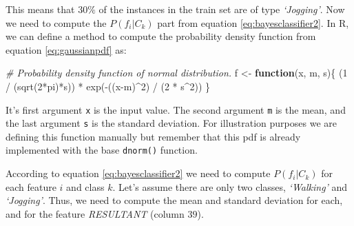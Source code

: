\documentclass[
  11pt,
]{krantz}
\newenvironment{Shaded}{\begin{snugshade}}{\end{snugshade}}
\newcommand{\CommentTok}[1]{\textcolor[rgb]{0.37,0.37,0.37}{\textit{#1}}}
\newcommand{\ControlFlowTok}[1]{\textcolor[rgb]{0.27,0.27,0.27}{\textbf{#1}}}
\newcommand{\DecValTok}[1]{\textcolor[rgb]{0.06,0.06,0.06}{#1}}
\newcommand{\FunctionTok}[1]{\textcolor[rgb]{0,0,0}{#1}}
\newcommand{\NormalTok}[1]{#1}
\newcommand{\OtherTok}[1]{\textcolor[rgb]{0.37,0.37,0.37}{#1}}
\newcommand{\SpecialCharTok}[1]{\textcolor[rgb]{0,0,0}{#1}}
\begin{document}
This means that \(30\%\) of the instances in the train set are of type \emph{`Jogging'}. Now we need to compute the \(P(f_i|C_k)\) part from equation \eqref{eq:bayesclassifier2}. In R, we can define a method to compute the probability density function from equation \eqref{eq:gaussianpdf} as:

\begin{Shaded}
\begin{Highlighting}[]
\CommentTok{\# Probability density function of normal distribution.}
\NormalTok{f }\OtherTok{\textless{}{-}} \ControlFlowTok{function}\NormalTok{(x, m, s)\{}
\NormalTok{  (}\DecValTok{1} \SpecialCharTok{/}\NormalTok{ (}\FunctionTok{sqrt}\NormalTok{(}\DecValTok{2}\SpecialCharTok{*}\NormalTok{pi)}\SpecialCharTok{*}\NormalTok{s)) }\SpecialCharTok{*} \FunctionTok{exp}\NormalTok{(}\SpecialCharTok{{-}}\NormalTok{((x}\SpecialCharTok{{-}}\NormalTok{m)}\SpecialCharTok{\^{}}\DecValTok{2}\NormalTok{) }\SpecialCharTok{/}\NormalTok{ (}\DecValTok{2} \SpecialCharTok{*}\NormalTok{ s}\SpecialCharTok{\^{}}\DecValTok{2}\NormalTok{))}
\NormalTok{\}}
\end{Highlighting}
\end{Shaded}

It's first argument \texttt{x} is the input value. The second argument \texttt{m} is the mean, and the last argument \texttt{s} is the standard deviation. For illustration purposes we are defining this function manually but remember that this pdf is already implemented with the base \texttt{dnorm()} function.

According to equation \eqref{eq:bayesclassifier2} we need to compute \(P(f_i|C_k)\) for each feature \(i\) and class \(k\). Let's assume there are only two classes, \emph{`Walking'} and \emph{`Jogging'}. Thus, we need to compute the mean and standard deviation for each, and for the feature \emph{RESULTANT} (column \(39\)).
\end{document}
